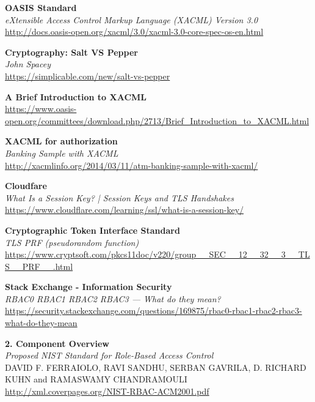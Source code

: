 \documentclass[10pt,a4paper]{article}
\begin{document}
\begin{thebibliography}{9}

 	\textbf{OASIS Standard}\\
 	\textit{eXtensible Access Control Markup Language (XACML) Version 3.0}\\
 	\url{http://docs.oasis-open.org/xacml/3.0/xacml-3.0-core-spec-os-en.html}
 
 	\textbf{Cryptography: Salt VS Pepper}\\
 	\textit{John Spacey}\\
	\url{https://simplicable.com/new/salt-vs-pepper}
 
 	\textbf{A Brief Introduction to XACML}\\
	\url{https://www.oasis-open.org/committees/download.php/2713/Brief_Introduction_to_XACML.html}
	
 	\textbf{XACML for authorization}\\
 	\textit{Banking Sample with XACML}\\
 	\url{http://xacmlinfo.org/2014/03/11/atm-banking-sample-with-xacml/}
 	
 	\textbf{Cloudfare}\\
 	\textit{What Is a Session Key? | Session Keys and TLS Handshakes}\\
 	\url{https://www.cloudflare.com/learning/ssl/what-is-a-session-key/}
 
 	\textbf{Cryptographic Token Interface Standard}\\
	\textit{TLS PRF (pseudorandom function)}\\
 	\url{https://www.cryptsoft.com/pkcs11doc/v220/group__SEC__12__32__3__TLS__PRF__.html}

 	\textbf{Stack Exchange - Information Security}\\
 	\textit{RBAC0 RBAC1 RBAC2 RBAC3 — What do they mean?}\\
 	\url{https://security.stackexchange.com/questions/169875/rbac0-rbac1-rbac2-rbac3-what-do-they-mean}
 
 	\textbf{2. Component Overview}\\
 	\textit{Proposed NIST Standard for Role-Based Access Control}\\
 	DAVID F. FERRAIOLO, RAVI SANDHU, SERBAN GAVRILA, D. RICHARD KUHN and RAMASWAMY CHANDRAMOULI\\
 	\url{http://xml.coverpages.org/NIST-RBAC-ACM2001.pdf}
 	

\end{thebibliography}
\end{document}
